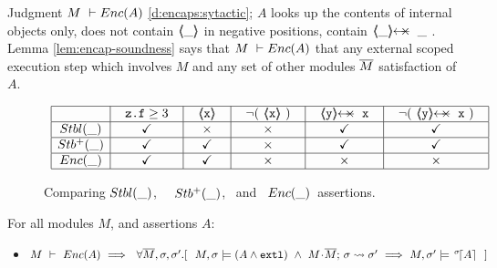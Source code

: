 Judgment $M\ \vdash {\ensuremath Enc( A )}$  %
\ref{d:encaps:sytactic};   $A$ looks up the contents of
internal objects only,   does not contain  $\langle\!\!\langle \_ \rangle\!\!\rangle$  in negative positions,  contain  $\protectedFrom {\_} {\_}$ .  
Lemma \ref{lem:encap-soundness} says that %
$M\ \vdash {\ensuremath Enc( A )}$  
that any external scoped execution step which involves $M$ and any set of other modules $\overline{M}$  %
 satisfaction of $A$. %
 


\begin{figure}[hbt] 
 $
 \begin{array}{c}
 \begin{array}{|c|c|c|c|c|c|}
 \hline
          & \ \ \prg{z.f}\geq 3  \ \ &  \ \   \inside{\prg{x}} \ \ & \ \ \neg(\ \inside{\prg{x}}\ ) \ \ & \ \ \protectedFrom {\prg{y}} {\prg{x}} \ \ &  \ \ \neg (\ \protectedFrom {\prg{y}} {\prg{x}}\ ) \ \ \\
   \hline
 \Stable  {\_}  &  \checkmark &  \times & \times &  \checkmark  &  \checkmark  \\
 \hline 
  \Pos {\_ } &  \checkmark &   \checkmark  & \times &  \checkmark  &  \checkmark  \\ 
  \hline 
  \encaps{\_ } &   \checkmark &  \checkmark & \times &   \times   &  \times \\ 
  \hline
 \end{array}
  \end{array}
 $
 \caption{Comparing ${Stbl( \_ )}$, \ \ ${Stb^+( \_ )}$, \ and \ ${Enc( \_ )}$\ assertions.}
 \label{f:Compare:stable:enc}
\end{figure}

\begin{lemma}[Encapsulation] %
\label{d:encaps}  For all modules $M$, and assertions $A$:  
\label{lem:encap-soundness}

\begin{itemize}
\item
$ \proves{M}{\encaps{A}}   \ \Longrightarrow\ \ \forall \Mtwo, \sigma, \sigma'.[   \ \  \satisfiesA{M}{\sigma}{(A  \wedge \externalexec)}\  \wedge\ { \leadstoBounded {M\madd\Mtwo}  {\sigma}{\sigma'}} %
        \  \Longrightarrow\  
    {M},{\sigma'}\models {\as \sigma A} \ \  ]$
 \end{itemize}
  
 \end{lemma}


